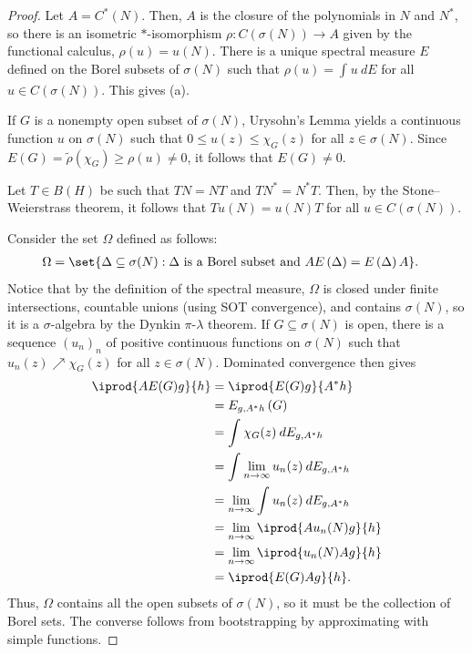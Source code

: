 \documentclass[10pt]{mypackage}
\begin{document}
\begin{proof}
  Let $A = C^{\ast}\left( N \right)$. Then, $A$ is the closure of the polynomials in $N$ and $N^{\ast}$, so there is an isometric $\ast$-isomorphism $\rho\colon C\left( \sigma(N) \right)\rightarrow A$ given by the functional calculus, $\rho(u) = u(N)$. There is a unique spectral measure $E$ defined on the Borel subsets of $\sigma(N)$ such that $\rho(u) = \int_{}^{} u\:dE$ for all $u\in C\left( \sigma(N) \right)$. This gives (a).

  If $G$ is a nonempty open subset of $\sigma(N)$, Urysohn's Lemma yields a continuous function $u$ on $\sigma(N)$ such that $0\leq u(z)\leq \chi_G(z)$ for all $z\in \sigma(N)$. Since $E(G) = \widetilde{\rho}\left( \chi_G \right) \geq \rho(u)\neq 0$, it follows that $E(G)\neq 0$.

  Let $T\in B(H)$ be such that $TN = NT$ and $TN^{\ast} = N^{\ast}T$. Then, by the Stone--Weierstrass theorem, it follows that $Tu\left( N \right) = u\left( N \right)T$ for all $u\in C\left( \sigma(N) \right)$.

  Consider the set $\Omega$ defined as follows:
  \begin{align*}
    \Omega &= \set{\Delta\subseteq \sigma(N) : \Delta\text{ is a Borel subset and }AE\left( \Delta \right) = E\left( \Delta \right)A}.
  \end{align*}
  Notice that by the definition of the spectral measure, $\Omega$ is closed under finite intersections, countable unions (using SOT convergence), and contains $\sigma(N)$, so it is a $\sigma$-algebra by the Dynkin $\pi$-$\lambda$ theorem. If $G\subseteq \sigma(N)$ is open, there is a sequence $\left( u_n \right)_n$ of positive continuous functions on $\sigma(N)$ such that $u_n(z)\nearrow \chi_G(z)$ for all $z\in \sigma(N)$. Dominated convergence then gives
  \begin{align*}
    \iprod{AE(G)g}{h} &= \iprod{E(G)g}{A^{\ast}h}\\
                      &= E_{g,A^{\ast}h}\left( G \right)\\
                      &= \int_{}^{} \chi_G(z)\:dE_{g,A^{\ast}h}\\
                      &= \int_{}^{} \lim_{n\rightarrow\infty}u_n(z)\:dE_{g,A^{\ast}h}\\
                      &= \lim_{n\rightarrow\infty} \int_{}^{} u_n(z)\:dE_{g,A^{\ast}h}\\
                      &= \lim_{n\rightarrow\infty} \iprod{Au_n(N)g}{h}\\
                      &= \lim_{n\rightarrow\infty} \iprod{u_n(N)Ag}{h}\\
                      &= \iprod{E(G)Ag}{h}.
  \end{align*}
  Thus, $\Omega$ contains all the open subsets of $\sigma(N)$, so it must be the collection of Borel sets. The converse follows from bootstrapping by approximating with simple functions.
\end{proof}
\end{document}
